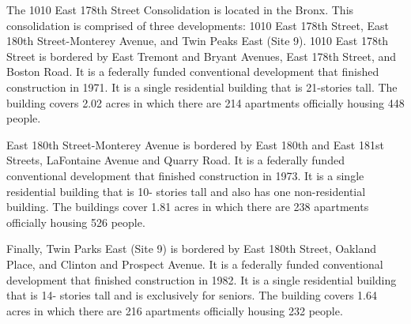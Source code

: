       

    

The 1010 East 178th Street Consolidation is located in the Bronx. This consolidation is comprised of three developments: 1010 East 178th Street, East 180th Street-Monterey Avenue, and Twin Peaks East (Site 9). 1010 East 178th Street is bordered by East Tremont and Bryant Avenues, East 178th Street, and Boston Road. It is a federally funded conventional development that finished construction in 1971. It is a single residential building that is 21-stories tall. The building covers 2.02 acres in which there are 214 apartments officially housing 448 people.  

East 180th Street-Monterey Avenue is bordered by East 180th and East 181st Streets, LaFontaine Avenue and Quarry Road. It is a federally funded conventional development that finished construction in 1973. It is a single residential building that is 10- stories tall and also has one non-residential building. The buildings cover 1.81 acres in which there are 238 apartments officially housing 526 people.  

Finally, Twin Parks East (Site 9) is bordered by East 180th Street, Oakland Place, and Clinton and Prospect Avenue. It is a federally funded conventional development that finished construction in 1982. It is a single residential building that is 14- stories tall and is exclusively for seniors. The building covers 1.64 acres in which there are 216 apartments officially housing 232 people.  